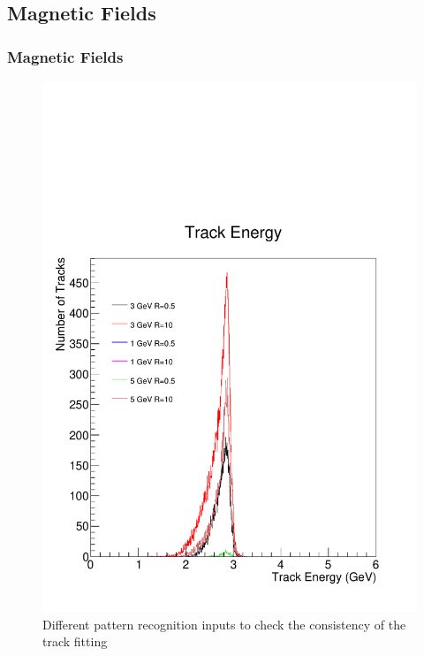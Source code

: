\documentclass{beamer}
\begin{document}
\subsection{Magnetic Fields}
\begin{frame}
\frametitle{Magnetic Fields}
\begin{figure}
\includegraphics[width=0.45\linewidth]{pics/beamE3B1.pdf}
\tiny{
\caption{Different pattern recognition inputs to check the consistency of the track fitting}
}
\end{figure}
\end{frame}
\end{document}
